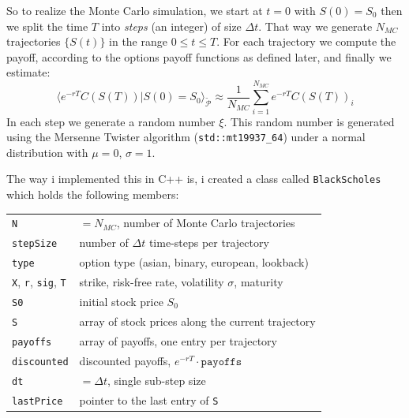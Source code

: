\documentclass[11pt]{article}
\begin{document}
So to realize the Monte Carlo simulation, we start at $t=0$ with $S(0) = S_0$ then we split the time $T$ into \textit{steps} (an integer) of size $\Delta t$. That way we generate $N_{MC}$ trajectories $\{S(t)\}$ in the range $0\leq t\leq T$. For each trajectory we compute the payoff, according to the options payoff functions as defined later, and finally we estimate:
\begin{equation}
    \langle e^{-rT} C(S(T))|S(0) = S_0 \rangle_{\mathcal{\tilde{P}}} \approx \frac{1}{N_{MC}} \sum_{i=1}^{N_{MC}} e^{-rT} C(S(T))_{i}
\end{equation}
In each step we generate a random number $\xi$. This random number is generated using the Mersenne Twister algorithm (\texttt{std::mt19937\_64}) under a normal distribution with $\mu=0$, $\sigma=1$.

The way i implemented this in C++ is, i created a class called \texttt{BlackScholes} which holds the following members:
\begin{center}
\renewcommand{\arraystretch}{1.2}
\begin{tabular}{@{}ll@{}}
\texttt{N} & $= N_{MC}$, number of Monte Carlo trajectories \\
\texttt{stepSize} & number of $\Delta t$ time-steps per trajectory \\
\texttt{type} & option type (asian, binary, european, lookback) \\
\texttt{X}, \texttt{r}, \texttt{sig}, \texttt{T} & strike, risk-free rate, volatility $\sigma$, maturity \\
\texttt{S0} & initial stock price $S_0$ \\
\texttt{S} & array of stock prices along the current trajectory \\
\texttt{payoffs} & array of payoffs, one entry per trajectory \\
\texttt{discounted} & discounted payoffs, $e^{-rT}\cdot\texttt{payoffs}$ \\
\texttt{dt} & $= \Delta t$, single sub-step size \\
\texttt{lastPrice} & pointer to the last entry of \texttt{S} \\
\end{tabular}
\end{center}
\end{document}
